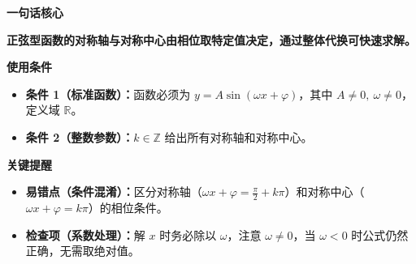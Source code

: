 \begin{summarybox}
	\textbf{\textcolor{CSummary}{一句话核心}}

	\textbf{正弦型函数的对称轴与对称中心由相位取特定值决定，通过整体代换可快速求解。}

	\medskip
	\textbf{\textcolor{CSummary}{使用条件}}
	\begin{itemize}[leftmargin=*, itemsep=0.5em, topsep=0.4em]
		\item \textbf{条件 1（标准函数）：}函数必须为 $y = A\sin(\omega x+\varphi)$，其中 $A\neq 0,\ \omega\neq 0$，定义域 $\mathbb{R}$。
		\item \textbf{条件 2（整数参数）：}$k\in\mathbb{Z}$ 给出所有对称轴和对称中心。
	\end{itemize}

	\medskip
	\textbf{\textcolor{CSummary}{关键提醒}}
	\begin{itemize}[leftmargin=*, itemsep=0.5em, topsep=0.4em]
		\item \textbf{易错点（条件混淆）：}区分对称轴（$\omega x+\varphi = \frac{\pi}{2}+k\pi$）和对称中心（$\omega x+\varphi = k\pi$）的相位条件。
		\item \textbf{检查项（系数处理）：}解 $x$ 时务必除以 $\omega$，注意 $\omega\neq 0$，当 $\omega<0$ 时公式仍然正确，无需取绝对值。
	\end{itemize}
\end{summarybox}
